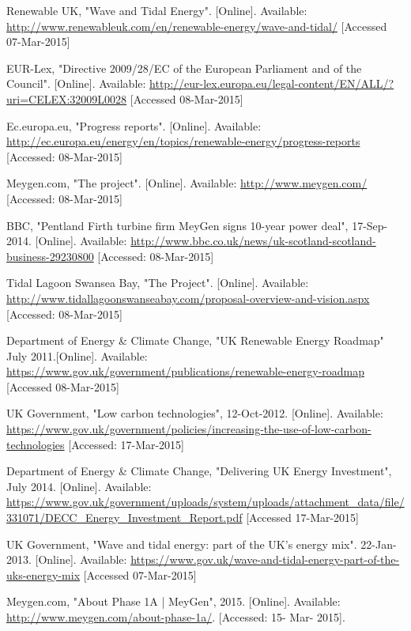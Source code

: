 \documentclass[a4paper,11pt]{article}
\begin{document}
\begin{thebibliography}{99}
	Renewable UK, "Wave and Tidal Energy". [Online]. Available: \url{http://www.renewableuk.com/en/renewable-energy/wave-and-tidal/} [Accessed 07-Mar-2015]

	EUR-Lex, "Directive 2009/28/EC of the European Parliament and of the Council". [Online]. Available: \url{http://eur-lex.europa.eu/legal-content/EN/ALL/?uri=CELEX:32009L0028} [Accessed 08-Mar-2015]
	
	Ec.europa.eu, "Progress reports". [Online]. Available: \url{http://ec.europa.eu/energy/en/topics/renewable-energy/progress-reports} [Accessed: 08-Mar-2015]
	
	Meygen.com, "The project". [Online]. Available: \url{http://www.meygen.com/} [Accessed: 08-Mar-2015]
	
	BBC, "Pentland Firth turbine firm MeyGen signs 10-year power deal", 17-Sep-2014. [Online]. Available: \url{http://www.bbc.co.uk/news/uk-scotland-scotland-business-29230800} [Accessed: 08-Mar-2015]
	
	Tidal Lagoon Swansea Bay, "The Project". [Online]. Available: \url{http://www.tidallagoonswanseabay.com/proposal-overview-and-vision.aspx} [Accessed: 08-Mar-2015]
	
	Department of Energy \& Climate Change, "UK Renewable Energy Roadmap" July 2011.[Online]. Available: \url{https://www.gov.uk/government/publications/renewable-energy-roadmap} [Accessed 08-Mar-2015]
	
	UK Government, "Low carbon technologies", 12-Oct-2012. [Online]. Available: \url{https://www.gov.uk/government/policies/increasing-the-use-of-low-carbon-technologies} [Accessed: 17-Mar-2015]
	
	Department of Energy \& Climate Change, "Delivering UK Energy Investment", July 2014. [Online]. Available: \url{https://www.gov.uk/government/uploads/system/uploads/attachment_data/file/331071/DECC_Energy_Investment_Report.pdf} [Accessed 17-Mar-2015]

	UK Government, "Wave and tidal energy: part of the UK's energy mix". 22-Jan-2013. [Online]. Available: \url{https://www.gov.uk/wave-and-tidal-energy-part-of-the-uks-energy-mix} [Accessed 07-Mar-2015]
	
	Meygen.com, "About Phase 1A | MeyGen", 2015. [Online]. Available: \url{http://www.meygen.com/about-phase-1a/}. [Accessed: 15- Mar- 2015].
	

\end{thebibliography}
\end{document}

